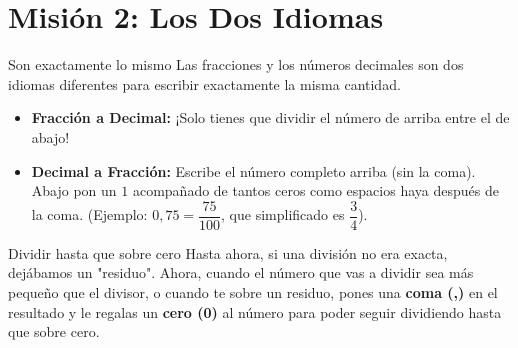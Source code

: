 \documentclass[12pt, letterpaper]{article}
\begin{document}
	
	\section*{Misión 2: Los Dos Idiomas}
	
	\begin{concepto}{Son exactamente lo mismo}
		Las fracciones y los números decimales son dos idiomas diferentes para escribir exactamente la misma cantidad.
		\begin{itemize}
			\item \textbf{Fracción a Decimal:} ¡Solo tienes que dividir el número de arriba entre el de abajo!
			\item \textbf{Decimal a Fracción:} Escribe el número completo arriba (sin la coma). Abajo pon un $1$ acompañado de tantos ceros como espacios haya después de la coma. (Ejemplo: $0,75 = \dfrac{75}{100}$, que simplificado es $\dfrac{3}{4}$).
		\end{itemize}
	\end{concepto}
	
	\begin{truco}{Dividir hasta que sobre cero}
		Hasta ahora, si una división no era exacta, dejábamos un "residuo". Ahora, cuando el número que vas a dividir sea más pequeño que el divisor, o cuando te sobre un residuo, pones una \textbf{coma (,)} en el resultado y le regalas un \textbf{cero (0)} al número para poder seguir dividiendo hasta que sobre cero.
	\end{truco}
	
\end{document}
